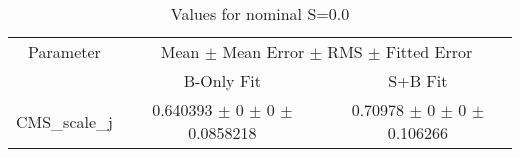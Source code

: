 \begin{table}
\centering
\caption{Values for nominal S=0.0}
\begin{tabular}{ccc}
\toprule
Parameter & \multicolumn{2}{c}{Mean $\pm$ Mean Error $\pm$ RMS $\pm$ Fitted Error}\\
 & B-Only Fit & S+B Fit\\
\midrule
CMS\_scale\_j & \num{0.640393} $\pm$ \num{0} $\pm$ \num{0} $\pm$ \num{0.0858218} & \num{0.70978} $\pm$ \num{0} $\pm$ \num{0} $\pm$ \num{0.106266}\\
\bottomrule
\end{tabular}
\end{table}